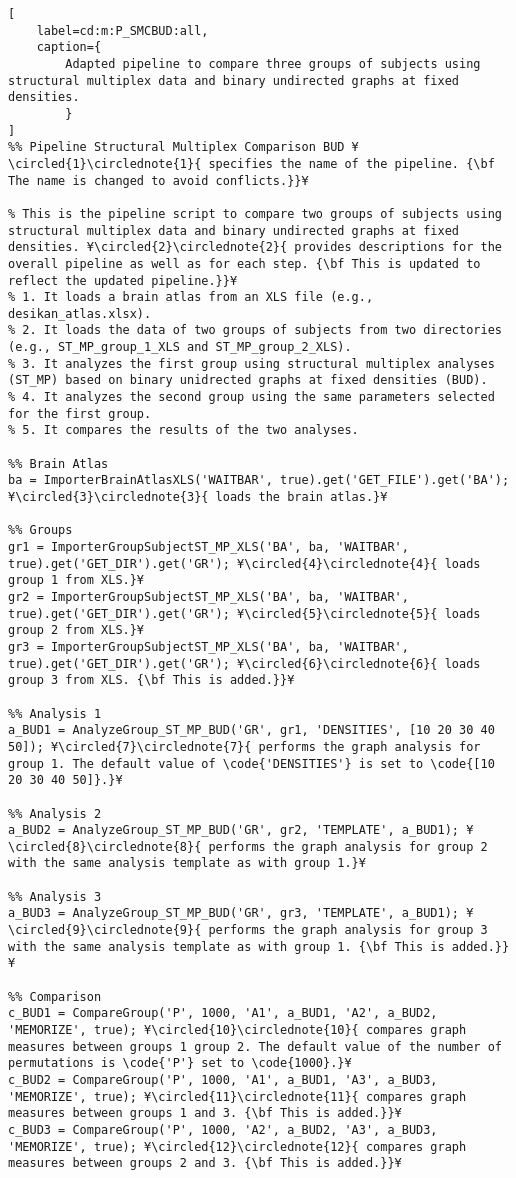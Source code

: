 \documentclass{tufte-handout}
\begin{document}
\begin{lstlisting}[
	label=cd:m:P_SMCBUD:all,
	caption={
		Adapted pipeline to compare three groups of subjects using structural multiplex data and binary undirected graphs at fixed densities.
		}
]
%% Pipeline Structural Multiplex Comparison BUD ¥\circled{1}\circlednote{1}{ specifies the name of the pipeline. {\bf The name is changed to avoid conflicts.}}¥

% This is the pipeline script to compare two groups of subjects using structural multiplex data and binary undirected graphs at fixed densities. ¥\circled{2}\circlednote{2}{ provides descriptions for the overall pipeline as well as for each step. {\bf This is updated to reflect the updated pipeline.}}¥
% 1. It loads a brain atlas from an XLS file (e.g., desikan_atlas.xlsx).
% 2. It loads the data of two groups of subjects from two directories (e.g., ST_MP_group_1_XLS and ST_MP_group_2_XLS).
% 3. It analyzes the first group using structural multiplex analyses (ST_MP) based on binary unidrected graphs at fixed densities (BUD).
% 4. It analyzes the second group using the same parameters selected for the first group.
% 5. It compares the results of the two analyses.

%% Brain Atlas
ba = ImporterBrainAtlasXLS('WAITBAR', true).get('GET_FILE').get('BA'); ¥\circled{3}\circlednote{3}{ loads the brain atlas.}¥

%% Groups
gr1 = ImporterGroupSubjectST_MP_XLS('BA', ba, 'WAITBAR', true).get('GET_DIR').get('GR'); ¥\circled{4}\circlednote{4}{ loads group 1 from XLS.}¥
gr2 = ImporterGroupSubjectST_MP_XLS('BA', ba, 'WAITBAR', true).get('GET_DIR').get('GR'); ¥\circled{5}\circlednote{5}{ loads group 2 from XLS.}¥
gr3 = ImporterGroupSubjectST_MP_XLS('BA', ba, 'WAITBAR', true).get('GET_DIR').get('GR'); ¥\circled{6}\circlednote{6}{ loads group 3 from XLS. {\bf This is added.}}¥

%% Analysis 1
a_BUD1 = AnalyzeGroup_ST_MP_BUD('GR', gr1, 'DENSITIES', [10 20 30 40 50]); ¥\circled{7}\circlednote{7}{ performs the graph analysis for group 1. The default value of \code{'DENSITIES'} is set to \code{[10 20 30 40 50]}.}¥

%% Analysis 2
a_BUD2 = AnalyzeGroup_ST_MP_BUD('GR', gr2, 'TEMPLATE', a_BUD1); ¥\circled{8}\circlednote{8}{ performs the graph analysis for group 2 with the same analysis template as with group 1.}¥

%% Analysis 3
a_BUD3 = AnalyzeGroup_ST_MP_BUD('GR', gr3, 'TEMPLATE', a_BUD1); ¥\circled{9}\circlednote{9}{ performs the graph analysis for group 3 with the same analysis template as with group 1. {\bf This is added.}}¥

%% Comparison
c_BUD1 = CompareGroup('P', 1000, 'A1', a_BUD1, 'A2', a_BUD2, 'MEMORIZE', true); ¥\circled{10}\circlednote{10}{ compares graph measures between groups 1 group 2. The default value of the number of permutations is \code{'P'} set to \code{1000}.}¥
c_BUD2 = CompareGroup('P', 1000, 'A1', a_BUD1, 'A3', a_BUD3, 'MEMORIZE', true); ¥\circled{11}\circlednote{11}{ compares graph measures between groups 1 and 3. {\bf This is added.}}¥
c_BUD3 = CompareGroup('P', 1000, 'A2', a_BUD2, 'A3', a_BUD3, 'MEMORIZE', true); ¥\circled{12}\circlednote{12}{ compares graph measures between groups 2 and 3. {\bf This is added.}}¥
\end{lstlisting}
\end{document}
